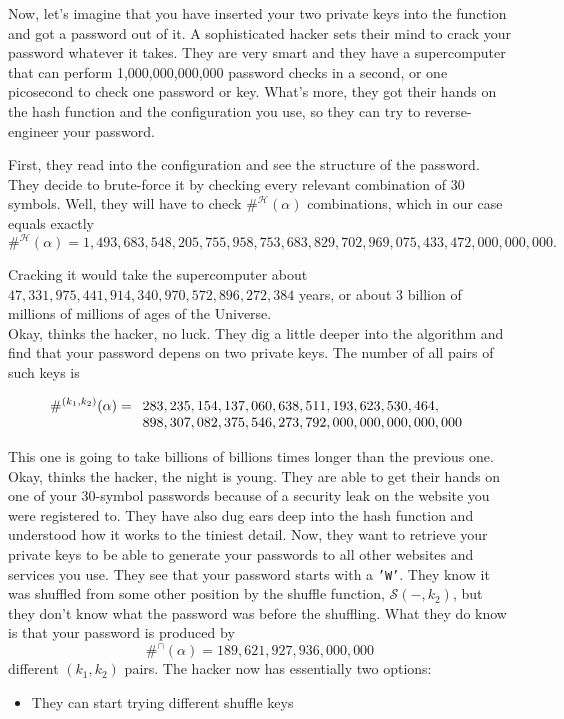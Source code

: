 \documentclass[12pt, a4paper]{article}
\renewcommand{\H}{\mathcal{H}}
\renewcommand{\S}{\mathcal{S}}
\begin{document}
Now, let's imagine that you have inserted your two private keys into the function and got a password out of it. A sophisticated hacker sets their mind to crack your password whatever it takes. They are very smart and they have a supercomputer that can perform 1,000,000,000,000 password checks in a second, or one picosecond to check one password or key. What's more, they got their hands on the hash function and the configuration you use, so they can try to reverse-engineer your password.

First, they read into the configuration and see the structure of the password. They decide to brute-force it by checking every relevant combination of 30 symbols. Well, they will have to check $ \#^{\H}(\alpha) $ combinations, which in our case equals exactly
\[ \#^{\H}(\alpha) = 1,493,683,548,205,755,958,753,683,829,702,969,075,433,472,000,000,000. \] 

Cracking it would take the supercomputer about $ 47,331,975,441,914,340,970,572,896,272,384 $ years, or about 3 billion of millions of millions of ages of the Universe.\\

Okay, thinks the hacker, no luck. They dig a little deeper into the algorithm and find that your password depens on two private keys. The number of all pairs of such keys is

\[
\#^{(k_1,k_2)}(\alpha) = \begin{array}[t]{l}
    283,235,154,137,060,638,511,193,623,530,464,\\
    898,307,082,375,546,273,792,000,000,000,000,000
\end{array}
\]

This one is going to take billions of billions times longer than the previous one.\\

Okay, thinks the hacker, the night is young. They are able to get their hands on one of your 30-symbol passwords because of a security leak on the website you were registered to. They have also dug ears deep into the hash function and understood how it works to the tiniest detail. Now, they want to retrieve your private keys to be able to generate your passwords to all other websites and services you use. They see that your password starts with a \texttt{'W'}. They know it was shuffled from some other position by the shuffle function, $ \S(-, k_2) $, but they don't know what the password was before the shuffling. What they do know is that your password is produced by
\[ \#^{\cap}(\alpha) = 189,621,927,936,000,000 \]
different $ (k_1, k_2) $ pairs. The hacker now has essentially two options:

\begin{itemize}
    \item They can start trying different shuffle keys
\end{itemize}
\end{document}
